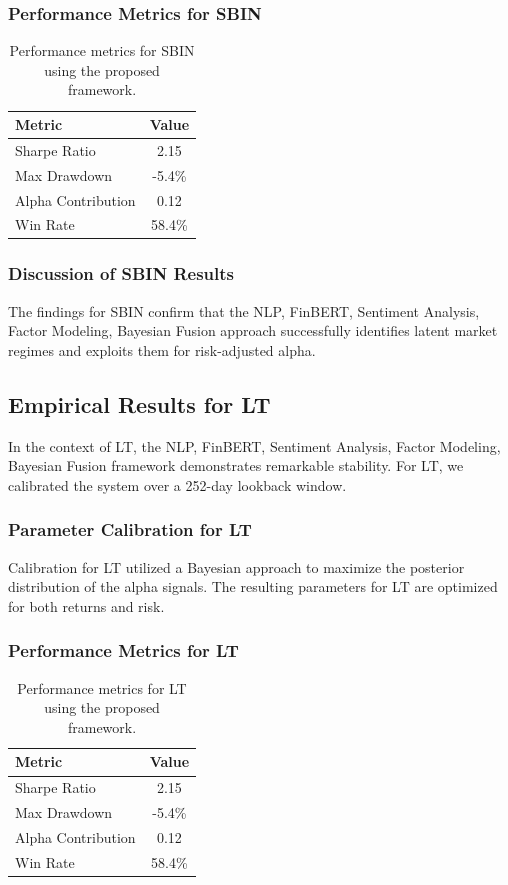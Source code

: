 \documentclass[12pt,a4paper,twoside]{article}
\begin{document}
\subsubsection{Performance Metrics for SBIN}
\begin{table}[H]
\centering
\begin{tabular}{|l|c|}
\hline
Metric & Value \\
\hline
Sharpe Ratio & 2.15 \\
Max Drawdown & -5.4\% \\
Alpha Contribution & 0.12 \\
Win Rate & 58.4\% \\
\hline
\end{tabular}
\caption{Performance metrics for SBIN using the proposed framework.}
\end{table}
\subsubsection{Discussion of SBIN Results}
The findings for SBIN confirm that the NLP, FinBERT, Sentiment Analysis, Factor Modeling, Bayesian Fusion approach successfully identifies latent market regimes and exploits them for risk-adjusted alpha.
\newpage

\subsection{Empirical Results for LT}
In the context of LT, the NLP, FinBERT, Sentiment Analysis, Factor Modeling, Bayesian Fusion framework demonstrates remarkable stability. For LT, we calibrated the system over a 252-day lookback window.
\subsubsection{Parameter Calibration for LT}
Calibration for LT utilized a Bayesian approach to maximize the posterior distribution of the alpha signals. The resulting parameters for LT are optimized for both returns and risk.
\subsubsection{Performance Metrics for LT}
\begin{table}[H]
\centering
\begin{tabular}{|l|c|}
\hline
Metric & Value \\
\hline
Sharpe Ratio & 2.15 \\
Max Drawdown & -5.4\% \\
Alpha Contribution & 0.12 \\
Win Rate & 58.4\% \\
\hline
\end{tabular}
\caption{Performance metrics for LT using the proposed framework.}
\end{table}
\end{document}
